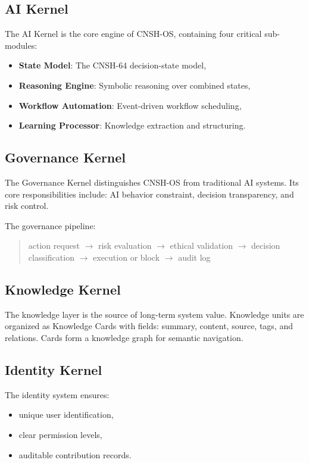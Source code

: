 \documentclass[conference]{IEEEtran}
\begin{document}
\subsection{AI Kernel}

The AI Kernel is the core engine of CNSH-OS, containing
four critical sub-modules:
\begin{itemize}[nosep]
  \item \textbf{State Model}: The CNSH-64 decision-state model,
  \item \textbf{Reasoning Engine}: Symbolic reasoning over
    combined states,
  \item \textbf{Workflow Automation}: Event-driven workflow
    scheduling,
  \item \textbf{Learning Processor}: Knowledge extraction
    and structuring.
\end{itemize}

\subsection{Governance Kernel}

The Governance Kernel distinguishes CNSH-OS from traditional
AI systems. Its core responsibilities include:
AI behavior constraint, decision transparency, and risk control.

The governance pipeline:
\begin{quote}
action request $\to$ risk evaluation $\to$ ethical validation
$\to$ decision classification $\to$ execution or block
$\to$ audit log
\end{quote}

\subsection{Knowledge Kernel}

The knowledge layer is the source of long-term system value.
Knowledge units are organized as Knowledge Cards with fields:
summary, content, source, tags, and relations.
Cards form a knowledge graph for semantic navigation.

\subsection{Identity Kernel}

The identity system ensures:
\begin{itemize}[nosep]
  \item unique user identification,
  \item clear permission levels,
  \item auditable contribution records.
\end{itemize}
\end{document}

